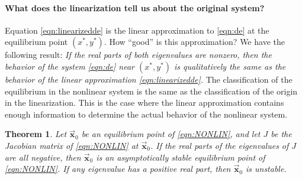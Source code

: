 \documentclass{book}
\newcommand{\BX}{\vec{\textbf{x}}}
\newtheorem{theorem}{Theorem}
\begin{document}
\paragraph{What does the linearization tell us about the original system?}
Equation \eqref{eqn:linearizedde}
is the linear approximation to \eqref{eqn:de} at the
equilibrium point $(x^*,y^*)$.
How ``good'' is this approximation?
We have the following result:
\emph{If the real parts of both eigenvalues
are nonzero, then the behavior of the system \eqref{eqn:de}
near $(x^*,y^*)$ is qualitatively the same as the behavior of the
linear approximation \eqref{eqn:linearizedde}.}
The classification of the equilibrium in the nonlinear system
is the same as the classification of the origin in
the linearization.
This is the case where the linear approximation contains
enough information to determine the actual behavior of the
nonlinear system.

\begin{theorem}
Let $\BX_0$ be an equilibrium point of
\eqref{eqn:NONLIN}, and let $J$ be the Jacobian
matrix of \eqref{eqn:NONLIN} at $\BX_0$.
If the real parts of the eigenvalues of $J$
are all negative, then $\BX_0$ is an
asymptotically stable equilibrium point
of \eqref{eqn:NONLIN}.
If any eigenvalue has a positive real part,
then $\BX_0$ is unstable.
\end{theorem}
\end{document}
